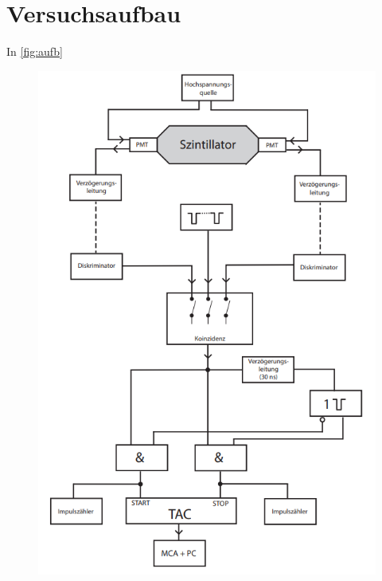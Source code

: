 \section{Versuchsaufbau}
In \autoref{fig:aufb} 
\begin{figure}[H]
    \centering
    \includegraphics[width=0.6\linewidth]{data/aufbau_schem.png}
    \label{fig:aufb}
\end{figure}
\noindent
\newpage
